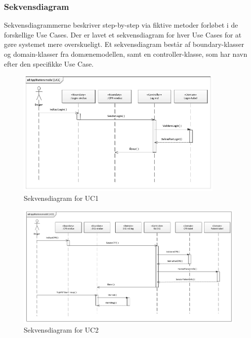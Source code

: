 \subsubsection{Sekvensdiagram}
Sekvensdiagrammerne beskriver step-by-step via fiktive metoder forløbet i de forskellige Use Cases. Der er lavet et sekvensdiagram for hver Use Cases for at gøre systemet mere overskueligt. Et sekvensdiagram består af boundary-klasser og domain-klasser fra domænemodellen, samt en controller-klasse, som har navn efter den specifikke Use Case.  

\begin{figure}[H]
	\centering
	\includegraphics[width=0.9\textwidth]{Figurer/Snip20150429_34}
	\caption{Sekvensdiagram for UC1}
\end{figure}

\begin{figure}[H]
	\centering
	\includegraphics[width=1\textwidth]{Figurer/Snip20150429_33}
	\caption{Sekvensdiagram for UC2}
\end{figure}

